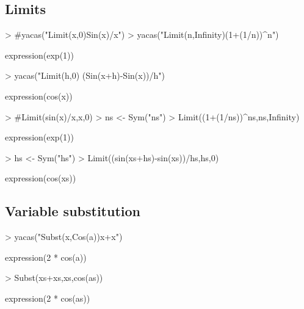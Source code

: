 \documentclass[]{article}
\begin{document}
\subsection{Limits}
\begin{Schunk}
\begin{Sinput}
> #yacas("Limit(x,0)Sin(x)/x")
> yacas("Limit(n,Infinity)(1+(1/n))^n")
\end{Sinput}
\begin{Soutput}
expression(exp(1))
\end{Soutput}
\begin{Sinput}
> yacas("Limit(h,0) (Sin(x+h)-Sin(x))/h")
\end{Sinput}
\begin{Soutput}
expression(cos(x))
\end{Soutput}
\end{Schunk}

\begin{Schunk}
\begin{Sinput}
> #Limit(sin(x)/x,x,0)
> ns <- Sym("ns")
> Limit((1+(1/ns))^ns,ns,Infinity)
\end{Sinput}
\begin{Soutput}
expression(exp(1))
\end{Soutput}
\begin{Sinput}
> hs <- Sym("hs")
> Limit((sin(xs+hs)-sin(xs))/hs,hs,0)
\end{Sinput}
\begin{Soutput}
expression(cos(xs))
\end{Soutput}
\end{Schunk}

\subsection{Variable substitution}

\begin{Schunk}
\begin{Sinput}
> yacas("Subst(x,Cos(a))x+x")
\end{Sinput}
\begin{Soutput}
expression(2 * cos(a))
\end{Soutput}
\end{Schunk}

\begin{Schunk}
\begin{Sinput}
> Subst(xs+xs,xs,cos(as))
\end{Sinput}
\begin{Soutput}
expression(2 * cos(as))
\end{Soutput}
\end{Schunk}
\end{document}
